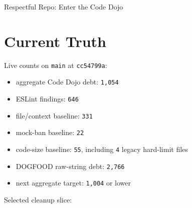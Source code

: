 \begin{CodeBlock}
Respectful Repo: Enter the Code Dojo
\end{CodeBlock}

\section{Current Truth}\label{record-235-current-truth}

Live counts on \texttt{m\allowbreak{}a\allowbreak{}i\allowbreak{}n} at \texttt{c\allowbreak{}c\allowbreak{}5\allowbreak{}4\allowbreak{}7\allowbreak{}9\allowbreak{}9\allowbreak{}a}:

\begin{itemize}
\tightlist
\item
  aggregate Code Dojo debt: \texttt{1\allowbreak{},\allowbreak{}0\allowbreak{}5\allowbreak{}4}
\item
  ESLint findings: \texttt{6\allowbreak{}4\allowbreak{}6}
\item
  file/context baseline: \texttt{3\allowbreak{}3\allowbreak{}1}
\item
  mock-ban baseline: \texttt{2\allowbreak{}2}
\item
  code-size baseline: \texttt{5\allowbreak{}5}, including \texttt{4} legacy hard-limit files
\item
  DOGFOOD raw-string debt: \texttt{2\allowbreak{},\allowbreak{}7\allowbreak{}6\allowbreak{}6}
\item
  next aggregate target: \texttt{1\allowbreak{},\allowbreak{}0\allowbreak{}0\allowbreak{}4} or lower
\end{itemize}

Selected cleanup slice:

